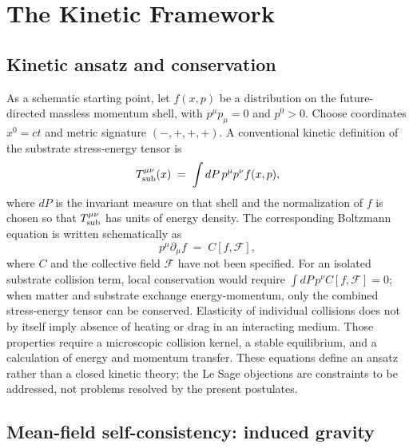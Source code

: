 \documentclass[11pt,a4paper]{article}
\begin{document}
\section{The Kinetic Framework}\label{sec:kinetic}

\subsection{Kinetic ansatz and conservation}

As a schematic starting point, let $f(x,p)$ be a distribution on the future-directed massless
momentum shell, with $p^\mu p_\mu=0$ and $p^0>0$. Choose coordinates $x^0=ct$ and metric signature
$(-,+,+,+)$. A conventional kinetic definition of the substrate stress-energy tensor is
\begin{equation}
T_{\rm sub}^{\mu\nu}(x) \;=\; \int dP\,p^\mu p^\nu f(x,p),
\end{equation}
where $dP$ is the invariant measure on that shell and the normalization of $f$ is chosen so that
$T_{\rm sub}^{\mu\nu}$ has units of energy density. The corresponding Boltzmann equation is written
schematically as
\begin{equation}
p^\mu \partial_\mu f \;=\; C[f,\mathcal{F}],
\end{equation}
where $C$ and the collective field $\mathcal{F}$ have not been specified. For an isolated
substrate collision term, local conservation would require
$\int dP\,p^\nu C[f,\mathcal{F}]=0$; when matter and substrate exchange energy-momentum, only the
combined stress-energy tensor can be conserved. Elasticity of individual collisions does not by
itself imply absence of heating or drag in an interacting medium. Those properties require a
microscopic collision kernel, a stable equilibrium, and a calculation of energy and momentum
transfer. These equations define an ansatz rather than a closed kinetic theory; the Le Sage
objections are constraints to be addressed, not problems resolved by the present postulates.

\subsection{Mean-field self-consistency: induced gravity}\label{sec:induced}
\end{document}
